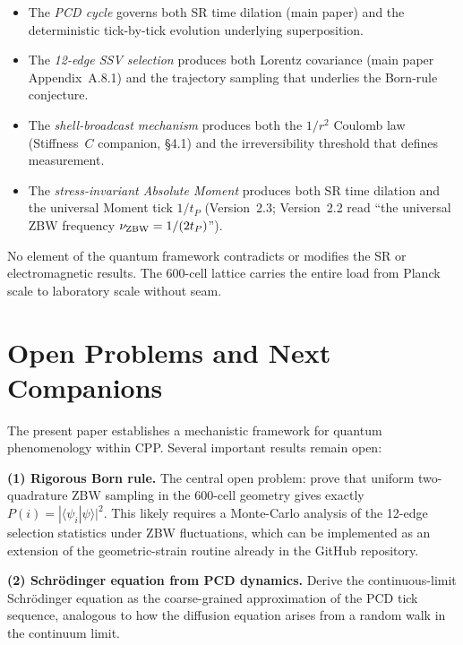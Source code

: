 \documentclass[12pt]{article}
\newcommand{\tP}{t_P}
\begin{document}
\begin{itemize}[noitemsep]
  \item The \emph{PCD cycle} governs both SR time dilation (main paper) and
    the deterministic tick-by-tick evolution underlying superposition.
  \item The \emph{12-edge SSV selection} produces both Lorentz covariance
    (main paper Appendix~A.8.1) and the trajectory sampling that underlies
    the Born-rule conjecture.
  \item The \emph{shell-broadcast mechanism} produces both the $1/r^2$
    Coulomb law (Stiffness~$C$ companion, \S 4.1) and the irreversibility
    threshold that defines measurement.
  \item The \emph{stress-invariant Absolute Moment} produces both SR time
    dilation and the universal Moment tick $1/\tP$ (Version~2.3; Version~2.2 read ``the universal ZBW frequency $\nu_{\rm ZBW} = 1/(2\tP)$'').
\end{itemize}

No element of the quantum framework contradicts or modifies the SR or
electromagnetic results.  The 600-cell lattice carries the entire load from
Planck scale to laboratory scale without seam.

\section{Open Problems and Next Companions}
\label{sec:open}

The present paper establishes a mechanistic framework for quantum
phenomenology within CPP.  Several important results remain open:

\textbf{(1) Rigorous Born rule.}  The central open problem: prove that
uniform two-quadrature ZBW sampling in the 600-cell geometry gives exactly
$P(i) = |\langle\psi_i|\psi\rangle|^2$.  This likely requires a Monte-Carlo
analysis of the 12-edge selection statistics under ZBW fluctuations, which
can be implemented as an extension of the geometric-strain routine already
in the GitHub repository.

\textbf{(2) Schr\"odinger equation from PCD dynamics.}  Derive the
continuous-limit Schr\"odinger equation as the coarse-grained approximation
of the PCD tick sequence, analogous to how the diffusion equation arises from
a random walk in the continuum limit.
\end{document}
